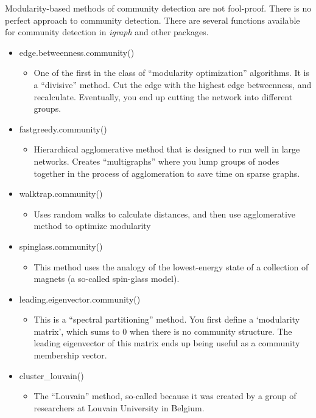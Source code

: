 \documentclass[
]{article}
\providecommand{\tightlist}{%
  \setlength{\itemsep}{0pt}\setlength{\parskip}{0pt}}
\begin{document}
Modularity-based methods of community detection are not fool-proof. There is no perfect approach to community detection. There are several functions available for community detection in \emph{igraph} and other packages.

\begin{itemize}
\tightlist
\item
  edge.betweenness.community()

  \begin{itemize}
  \tightlist
  \item
    One of the first in the class of ``modularity optimization'' algorithms. It is a ``divisive'' method. Cut the edge with the highest edge betweenness, and recalculate. Eventually, you end up cutting the network into different groups.
  \end{itemize}
\item
  fastgreedy.community()

  \begin{itemize}
  \tightlist
  \item
    Hierarchical agglomerative method that is designed to run well in large networks. Creates ``multigraphs'' where you lump groups of nodes together in the process of agglomeration to save time on sparse graphs.
  \end{itemize}
\item
  walktrap.community()

  \begin{itemize}
  \tightlist
  \item
    Uses random walks to calculate distances, and then use agglomerative method to optimize modularity
  \end{itemize}
\item
  spinglass.community()

  \begin{itemize}
  \tightlist
  \item
    This method uses the analogy of the lowest-energy state of a collection of magnets (a so-called spin-glass model).
  \end{itemize}
\item
  leading.eigenvector.community()

  \begin{itemize}
  \tightlist
  \item
    This is a ``spectral partitioning'' method. You first define a `modularity matrix', which sums to 0 when there is no community structure. The leading eigenvector of this matrix ends up being useful as a community membership vector.
  \end{itemize}
\item
  cluster\_louvain()

  \begin{itemize}
  \tightlist
  \item
    The ``Louvain'' method, so-called because it was created by a group of researchers at Louvain University in Belgium.
  \end{itemize}
\end{itemize}
\end{document}
